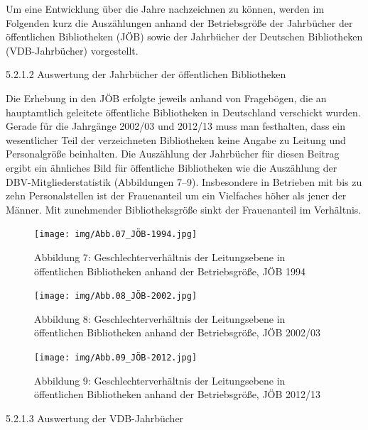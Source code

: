 \documentclass[a4paper,
fontsize=11pt,
oneside,
numbers=noperiodatend,
parskip=half-,
bibliography=totoc,
final
]{scrartcl}
\begin{document}
Um eine Entwicklung über die Jahre nachzeichnen zu können, werden im
Folgenden kurz die Auszählungen anhand der Betriebsgröße der Jahrbücher
der öffentlichen Bibliotheken (JÖB) sowie der Jahrbücher der Deutschen
Bibliotheken (VDB-Jahrbücher) vorgestellt.

5.2.1.2 Auswertung der Jahrbücher der öffentlichen Bibliotheken

Die Erhebung in den JÖB erfolgte jeweils anhand von Fragebögen, die an
hauptamtlich geleitete öffentliche Bibliotheken in Deutschland
verschickt wurden. Gerade für die Jahrgänge 2002/03 und 2012/13 muss man
festhalten, dass ein wesentlicher Teil der verzeichneten Bibliotheken
keine Angabe zu Leitung und Personalgröße beinhalten. Die Auszählung der
Jahrbücher für diesen Beitrag ergibt ein ähnliches Bild für öffentliche
Bibliotheken wie die Auszählung der DBV-Mitgliederstatistik (Abbildungen
7--9). Insbesondere in Betrieben mit bis zu zehn Personalstellen ist der
Frauenanteil um ein Vielfaches höher als jener der Männer. Mit
zunehmender Bibliotheksgröße sinkt der Frauenanteil im Verhältnis.

\begin{figure}
\centering
\texttt{[image: img/Abb.07\_JÖB-1994.jpg]}
\caption{Abbildung 7: Geschlechterverhältnis der Leitungsebene in
öffentlichen Bibliotheken anhand der Betriebsgröße, JÖB 1994}
\end{figure}

\begin{figure}
\centering
\texttt{[image: img/Abb.08\_JÖB-2002.jpg]}
\caption{Abbildung 8: Geschlechterverhältnis der Leitungsebene in
öffentlichen Bibliotheken anhand der Betriebsgröße, JÖB 2002/03}
\end{figure}

\begin{figure}
\centering
\texttt{[image: img/Abb.09\_JÖB-2012.jpg]}
\caption{Abbildung 9: Geschlechterverhältnis der Leitungsebene in
öffentlichen Bibliotheken anhand der Betriebsgröße, JÖB 2012/13}
\end{figure}

5.2.1.3 Auswertung der VDB-Jahrbücher
\end{document}
